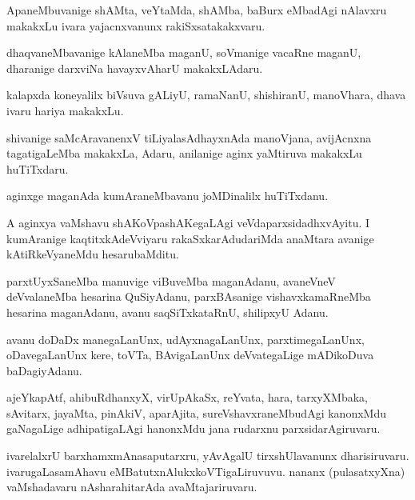 \documentclass{article}
\begin{document}
\begin{mn}
ApaneMbuvanige shAMta, veYtaMda, shAMba, baBurx eMbadAgi nAlavxru
makakxLu ivara yajacnxvanunx rakiSxsatakakxvaru.
\end{mn}

\begin{mn}
dhaqvaneMbavanige kAlaneMba maganU, soVmanige vacaRne maganU,
dharanige darxviNa havayxvAharU makakxLAdaru.
\end{mn}

\begin{mn}
kalapxda koneyalilx biVsuva gALiyU, ramaNanU, shishiranU, manoVhara,
dhava ivaru hariya makakxLu.
\end{mn}

\begin{mn}
shivanige saMcAravanenxV tiLiyalasAdhayxnAda manoVjana, avijAcnxna
tagatigaLeMba makakxLa, Adaru, anilanige aginx yaMtiruva makakxLu huTiTxdaru.
\end{mn}

\begin{mn}%
aginxge maganAda kumAraneMbavanu joMDinalilx huTiTxdanu.
\end{mn}

\begin{mn}
A aginxya vaMshavu shAKoVpashAKegaLAgi veVdaparxsidadhxvAyitu. I
kumAranige kaqtitxkAdeVviyaru rakaSxkarAdudariMda anaMtara avanige
kAtiRkeVyaneMdu hesarubaMditu.
\end{mn}

\begin{mn}
parxtUyxSaneMba manuvige viBuveMba maganAdanu, avaneVneV deVvalaneMba
hesarina QuSiyAdanu, parxBAsanige vishavxkamaRneMba hesarina
maganAdanu, avanu saqSiTxkataRnU, shilipxyU Adanu.
\end{mn}

\begin{mn}
avanu doDaDx manegaLanUnx, udAyxnagaLanUnx, parxtimegaLanUnx,
oDavegaLanUnx kere, toVTa, BAvigaLanUnx deVvategaLige mADikoDuva baDagiyAdanu.
\end{mn}

\begin{mn}%
ajeYkapAtf, ahibuRdhanxyX, virUpAkaSx, reYvata, hara, tarxyXMbaka,
sAvitarx, jayaMta, pinAkiV, aparAjita, sureVshavxraneMbudAgi kanonxMdu
gaNagaLige adhipatigaLAgi hanonxMdu jana rudarxnu parxsidarAgiruvaru.
\end{mn}

\begin{mn}
ivarelalxrU barxhamxmAnasaputarxru, yAvAgalU tirxshUlavanunx
dharisiruvaru. ivarugaLasamAhavu eMBatutxnAlukxkoVTigaLiruvuvu. nananx
(pulasatxyXna) vaMshadavaru nAsharahitarAda avaMtajariruvaru.
\end{mn} 
\end{document}
